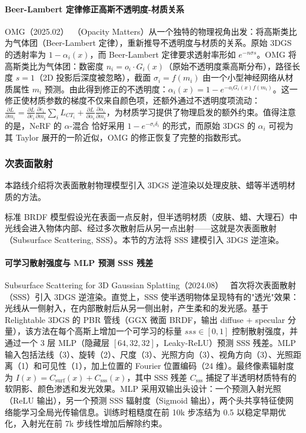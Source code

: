 \paragraph{Beer-Lambert 定律修正高斯不透明度-材质关系}

OMG（2025.02）~\cite{2502_10988}（Opacity Matters）从一个独特的物理视角出发：将高斯类比为气体团（Beer-Lambert 定律），重新推导不透明度与材质的关系。原始 3DGS 的透射率为 $1-\alpha_i(x)$，而 Beer-Lambert 定律要求透射率形如 $e^{-n\sigma s}$。OMG 将高斯类比为气体团：数密度 $n_i = o_i \cdot G_i(x)$（原始不透明度乘高斯分布），路径长度 $s=1$（2D 投影后深度被忽略），截面 $\sigma_i = f(m_i)$ 由一个小型神经网络从材质属性 $m_i$ 预测。由此得到修正的不透明度：$\alpha_i(x) = 1 - e^{-o_i G_i(x) f(m_i)}$。这一修正使材质参数的梯度不仅来自颜色项，还额外通过不透明度项流动：$\frac{\partial L}{\partial m_i} = \frac{\partial L}{\partial c_i}\frac{\partial c_i}{\partial m_i}\sum_i L_{CT_i} + \frac{\partial L}{\partial\alpha_i}\frac{\partial\alpha_i}{\partial m_i}$，为材质学习提供了物理启发的额外约束。值得注意的是，NeRF 的 $\alpha$-混合 恰好采用 $1-e^{-\sigma_i\delta_i}$ 的形式，而原始 3DGS 的 $\alpha_i$ 可视为其 Taylor 展开的一阶近似，OMG 的修正恢复了完整的指数形式。

\subsubsection{次表面散射}

本路线介绍将次表面散射物理模型引入 3DGS 逆渲染以处理皮肤、蜡等半透明材质的方法。

标准 BRDF 模型假设光在表面一点反射，但半透明材质（皮肤、蜡、大理石）中光线会进入物体内部、经过多次散射后从另一点出射——这就是次表面散射（Subsurface Scattering, SSS）。本节的方法将 SSS 建模引入 3DGS 逆渲染。

\paragraph{可学习散射强度与 MLP 预测 SSS 残差}

Subsurface Scattering for 3D Gaussian Splatting（2024.08）~\cite{2408_12282} 首次将次表面散射（SSS）引入 3DGS 逆渲染。直觉上，SSS 使半透明物体呈现特有的"透光"效果：光线从一侧射入，在内部散射后从另一侧出射，产生柔和的发光感。基于 Relightable 3DGS 的 PBR 管线（GGX 微面 BRDF，输出 diffuse + specular 分量），该方法在每个高斯上增加一个可学习的标量 $sss \in [0,1]$ 控制散射强度，并通过一个 3 层 MLP（隐藏层 $[64,32,32]$，Leaky-ReLU）预测 SSS 残差。MLP 输入包括法线（3）、旋转（2）、尺度（3）、光照方向（3）、视角方向（3）、光照距离（1）和可见性（1），加上位置的 Fourier 位置编码（24 维）。最终像素辐射度为 $I(x) = C_{\text{surf}}(x) + C_{\text{sss}}(x)$，其中 SSS 残差 $C_{\text{sss}}$ 捕捉了半透明材质特有的软阴影、颜色渗透和发光效果。MLP 采用双输出头设计：一个预测入射光照（ReLU 输出），另一个预测 SSS 辐射度（Sigmoid 输出），两个头共享特征使网络能学习全局光传输信息。训练时粗糙度在前 10k 步冻结为 0.5 以稳定早期优化，入射光在前 7k 步线性增加后解除约束。


